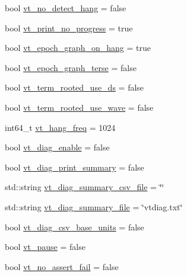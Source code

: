 \begin{DoxyCompactItemize}
\item 
bool \hyperlink{structvt_1_1arguments_1_1_app_config_a5cab0e03f494700d6b27aff2c8a1399c}{vt\+\_\+no\+\_\+detect\+\_\+hang} = false
\item 
bool \hyperlink{structvt_1_1arguments_1_1_app_config_ab8b0ebcbe69f49e525bf5ce152ad43f5}{vt\+\_\+print\+\_\+no\+\_\+progress} = true
\item 
bool \hyperlink{structvt_1_1arguments_1_1_app_config_af7f54f986814f23a1c53932f8bf52e3c}{vt\+\_\+epoch\+\_\+graph\+\_\+on\+\_\+hang} = true
\item 
bool \hyperlink{structvt_1_1arguments_1_1_app_config_a25d80ec055614d39dd4039dde1faa94e}{vt\+\_\+epoch\+\_\+graph\+\_\+terse} = false
\item 
bool \hyperlink{structvt_1_1arguments_1_1_app_config_ae30cd8bb7ca3829fec86f46834a3270c}{vt\+\_\+term\+\_\+rooted\+\_\+use\+\_\+ds} = false
\item 
bool \hyperlink{structvt_1_1arguments_1_1_app_config_ac850fa3db23b49940d9f710c66639189}{vt\+\_\+term\+\_\+rooted\+\_\+use\+\_\+wave} = false
\item 
int64\+\_\+t \hyperlink{structvt_1_1arguments_1_1_app_config_a87132fc94952be73006d525f7d242349}{vt\+\_\+hang\+\_\+freq} = 1024
\item 
bool \hyperlink{structvt_1_1arguments_1_1_app_config_a35f135d830a4bb60edfdebfd33b2f2b4}{vt\+\_\+diag\+\_\+enable} = false
\item 
bool \hyperlink{structvt_1_1arguments_1_1_app_config_a7105cf4ae1b7b6ead255124994d9ea8c}{vt\+\_\+diag\+\_\+print\+\_\+summary} = false
\item 
std\+::string \hyperlink{structvt_1_1arguments_1_1_app_config_a35b0bd57e91e156660d7e5acbcbc8d28}{vt\+\_\+diag\+\_\+summary\+\_\+csv\+\_\+file} = \char`\"{}\char`\"{}
\item 
std\+::string \hyperlink{structvt_1_1arguments_1_1_app_config_a3a345aa1fff61f684a962161c1047856}{vt\+\_\+diag\+\_\+summary\+\_\+file} = \char`\"{}vtdiag.\+txt\char`\"{}
\item 
bool \hyperlink{structvt_1_1arguments_1_1_app_config_a9960924b4253fb072c3a44c9bd3c06ce}{vt\+\_\+diag\+\_\+csv\+\_\+base\+\_\+units} = false
\item 
bool \hyperlink{structvt_1_1arguments_1_1_app_config_a2064c7bded4e44c59316091cd193afc4}{vt\+\_\+pause} = false
\item 
bool \hyperlink{structvt_1_1arguments_1_1_app_config_ac9da4413611abdac83c9bd83722d7d4a}{vt\+\_\+no\+\_\+assert\+\_\+fail} = false
\item 

\end{DoxyCompactItemize}
